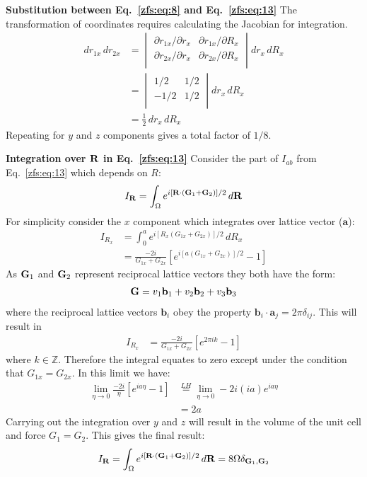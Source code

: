 \textbf{Substitution between Eq.~\ref{zfs:eq:8} and Eq.~\ref{zfs:eq:13}}
The transformation of coordinates requires calculating the Jacobian for integration.
\begin{align}
    dr_{1x}\,dr_{2x} &=
    \begin{vmatrix}
        \partial r_{1x} /\partial r_x & \partial r_{1x} /\partial R_x \\
        \partial r_{2x} /\partial r_x & \partial r_{2x} /\partial R_x \\
    \end{vmatrix}
    dr_x\,dR_x \nonumber \\
    &=
    \begin{vmatrix}
         1/2 &  1/2 \\
        -1/2 &  1/2 \\
    \end{vmatrix}
    dr_x\,dR_x \nonumber \\
    &= \frac{1}{2}\, dr_x\,dR_x
\end{align}
Repeating for $y$ and $z$ components gives a total factor of $1/8$.


\textbf{Integration over $\mathbf{R}$ in Eq.~\ref{zfs:eq:13}}
Consider the part of $I_{ab}$ from Eq.~\ref{zfs:eq:13} which depends on $R$:
\begin{align}
    I_{\mathbf{R}} = \int_{\Omega} e^{i[\mathbf{R}\cdot(\mathbf{G}_1+\mathbf{G}_2)]/2}\, d\mathbf{R}
\end{align}
For simplicity consider the $x$ component which integrates over lattice vector ($\mathbf{a}$):
\begin{align}
    I_{R_x} &= \int_{0}^{a} e^{i[R_x(G_{1x}+G_{2x})]/2}\, dR_x \nonumber \\
    &= \frac{-2i}{G_{1x}+G_{2x}}\left[ e^{i[a(G_{1x}+G_{2x})]/2} - 1 \right]
\end{align}
As $\mathbf{G}_1$ and $\mathbf{G}_2$ represent reciprocal lattice vectors they both have the form:
\begin{align}
    \mathbf{G} = v_1\mathbf{b}_1 + v_2\mathbf{b}_2 + v_3\mathbf{b}_3
\end{align}
where the reciprocal lattice vectors $\mathbf{b}_i$ obey the property $\mathbf{b}_i\cdot\mathbf{a}_j=2\pi\delta_{ij}$. This will result in
\begin{align}
    I_{R_x} &= \frac{-2i}{G_{1x}+G_{2x}}\left[ e^{2\pi i k} - 1 \right]
\end{align}
where $k \in \mathbb{Z}$. Therefore the integral equates to zero except under the condition that $G_{1x}=G_{2x}$. In this limit we have:
\begin{align}
    \lim_{\eta\to 0} \frac{-2i}{\eta}\left[ e^{ia \eta} -1 \right]
    &\overset{LH}{=} \lim_{\eta\to 0} -2i (ia) e^{ia \eta} \nonumber \\
    &= 2a
\end{align}
Carrying out the integration over $y$ and $z$ will result in the volume of the unit cell and force $G_{1}=G_{2}$. This gives the final result:
\begin{align}
    I_{\mathbf{R}} = \int_{\Omega} e^{i[\mathbf{R}\cdot(\mathbf{G}_1+\mathbf{G}_2)]/2}\, d\mathbf{R} = 8\Omega \delta_{\mathbf{G}_1,\mathbf{G}_2}
\end{align}


